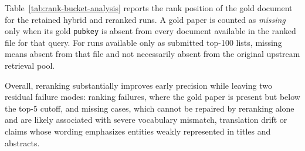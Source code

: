 Table~\ref{tab:rank-bucket-analysis} reports the rank position of the gold document for the retained hybrid and reranked runs. A gold paper is counted as \textit{missing} only when its gold \texttt{pubkey} is absent from every document available in the ranked file for that query. For runs available only as submitted top-100 lists, missing means absent from that file and not necessarily absent from the original upstream retrieval pool.

\begin{table}[htbp]
    \centering
    \footnotesize
    \caption{Rank buckets for the retained hybrid and reranked English runs. Percentages are computed within each split: 14,977 labeled English queries, 3,905 English DEV queries, and 6,076 English TEST queries.}
    \label{tab:rank-bucket-analysis}
\end{table}

Overall, reranking substantially improves early precision while leaving two residual failure modes: ranking failures, where the gold paper is present but below the top-5 cutoff, and missing cases, which cannot be repaired by reranking alone and are likely associated with severe vocabulary mismatch, translation drift or claims whose wording emphasizes entities weakly represented in titles and abstracts. 


